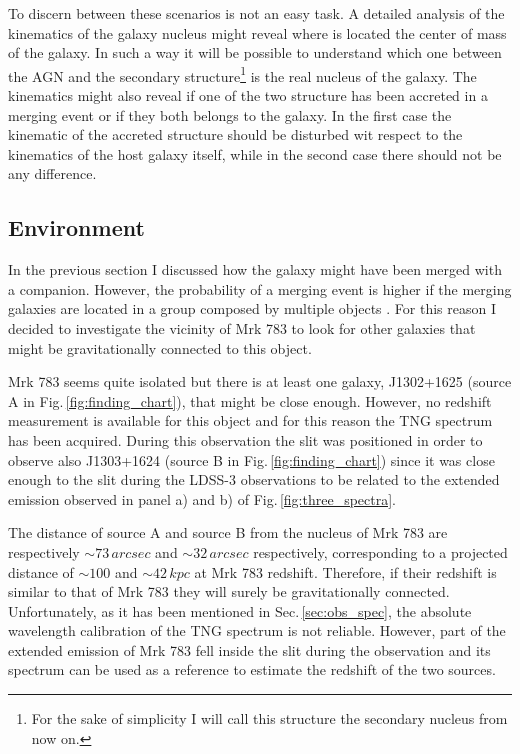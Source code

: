 \documentclass[../main.tex]{subfiles}
\begin{document}
To discern between these scenarios is not an easy task.
A detailed analysis of the kinematics of the galaxy nucleus might reveal where is located the center of mass of the galaxy.
In such a way it will be possible to understand which one between the AGN and the secondary structure\footnote{For the sake of simplicity I will call this structure the secondary nucleus from now on.} is the real nucleus of the galaxy.
The kinematics might also reveal if one of the two structure has been accreted in a merging event or if they both belongs to the galaxy.
In the first case the kinematic of the accreted structure should be disturbed wit respect to the kinematics of the host galaxy itself, while in the second case there should not be any difference.

\subsection{Environment}
\label{sec:environment}

In the previous section I discussed how the galaxy might have been merged with a companion.
However, the probability of a merging event is higher if the merging galaxies are located in a group composed by multiple objects \citep{Kampczyk13}.
For this reason I decided to investigate the vicinity of Mrk 783 to look for other galaxies that might be gravitationally connected to this object.

Mrk 783 seems quite isolated but there is at least one galaxy, J1302+1625 (source A in Fig.\,\ref{fig:finding_chart}), that might be close enough. 
However, no redshift measurement is available for this object and for this reason the TNG spectrum has been acquired.
During this observation the slit was positioned in order to observe also J1303+1624 (source B in Fig.\,\ref{fig:finding_chart}) since it was close enough to the slit during the LDSS-3 observations to be related to the extended emission observed in panel a) and b) of Fig.\,\ref{fig:three_spectra}.

The distance of source A and source B from the nucleus of Mrk 783 are respectively $\sim 73\,\si{arcsec}$ and $\sim 32\,\si{arcsec}$ respectively, corresponding to a projected distance of $\sim100$ and $\sim42\,\si{kpc}$ at Mrk 783 redshift.
Therefore, if their redshift is similar to that of Mrk 783 they will surely be gravitationally connected.
Unfortunately, as it has been mentioned in Sec.\,\ref{sec:obs_spec}, the absolute wavelength calibration of the TNG spectrum is not reliable.
However, part of the extended emission of Mrk 783 fell inside the slit during the observation and its spectrum can be used as a reference to estimate the redshift of the two sources.
\end{document}
